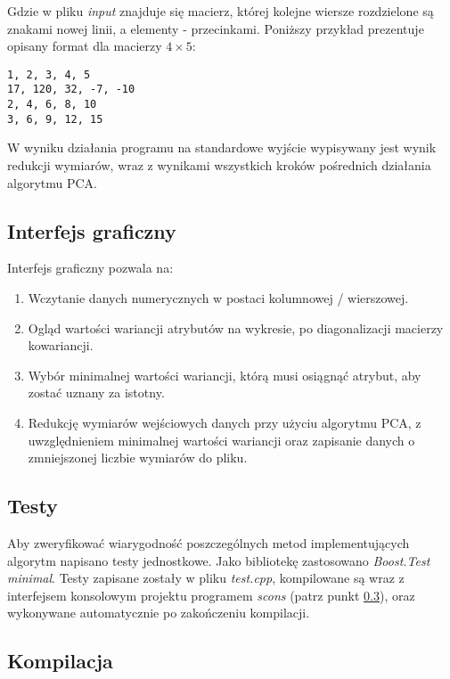 \documentclass{article}
\begin{document}
\noindent Gdzie w pliku \emph{input} znajduje się macierz, której kolejne wiersze rozdzielone są znakami nowej linii, a elementy - przecinkami. Poniższy przykład prezentuje opisany format dla macierzy $4 \times 5$:

\begin{verbatim}
1, 2, 3, 4, 5
17, 120, 32, -7, -10
2, 4, 6, 8, 10
3, 6, 9, 12, 15
\end{verbatim}

\noindent W wyniku działania programu na standardowe wyjście wypisywany jest wynik redukcji wymiarów, wraz z wynikami wszystkich kroków pośrednich działania algorytmu PCA.

\subsection{Interfejs graficzny}

Interfejs graficzny pozwala na:
\begin{enumerate}
\item{Wczytanie danych numerycznych w postaci kolumnowej / wierszowej.}
\item{Ogląd wartości wariancji atrybutów na wykresie, po diagonalizacji macierzy kowariancji.}
\item{Wybór minimalnej wartości wariancji, którą musi osiągnąć atrybut, aby zostać uznany za istotny.}
\item{Redukcję wymiarów wejściowych danych przy użyciu algorytmu PCA, z uwzględnieniem minimalnej wartości wariancji oraz zapisanie danych o zmniejszonej liczbie wymiarów do pliku.}
\end{enumerate}

\subsection{Testy}

Aby zweryfikować wiarygodność poszczególnych metod implementujących algorytm napisano testy jednostkowe. Jako bibliotekę zastosowano \emph{Boost.Test minimal}. Testy zapisane zostały w pliku \emph{test.cpp}, kompilowane są wraz z interfejsem konsolowym projektu programem \emph{scons} (patrz punkt \ref{lab_kompilacja}), oraz wykonywane automatycznie po zakończeniu kompilacji.

\subsection{Kompilacja} \label{lab_kompilacja}
\end{document}

